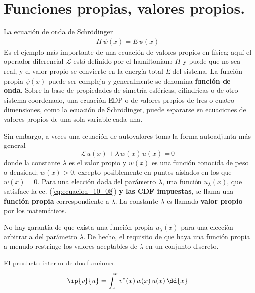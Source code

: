 \section{Funciones propias, valores propios.}
La ecuación de onda de Schrödinger
\begin{align*}
H \, \psi (x) = E \, \psi (x)
\end{align*}
Es el ejemplo más importante de una ecuación de valores propios en física; aquí el operador diferencial $\mathcal{L}$ está definido por el hamiltoniano $H$ y puede que no sea real, y el valor propio se convierte en la energía total $E$ del sistema. La función propia $\psi (x)$ puede ser compleja y generalmente se denomina \textbf{función de onda}. Sobre la base de propiedades de simetría esféricas, cilíndricas o de otro sistema coordenado, una ecuación EDP o de valores propios de tres o cuatro dimensiones, como la ecuación de Schrödinger, puede separarse en ecuaciones de valores propios de una sola variable cada una.
\par
Sin embargo, a veces una ecuación de autovalores toma la forma autoadjunta más general
\begin{equation}
\mathcal{L} \, u(x) + \lambda \, w(x) \, u(x) = 0
\label{eq:ecuacion_10_08}
\end{equation}
donde la constante $\lambda$ es el valor propio y $w(x)$ es una función conocida de peso o densidad; $w(x) > 0$, excepto posiblemente en puntos aislados en los que $w(x) = 0$. Para una elección dada del parámetro $\lambda$, una función $u_{\lambda}(x)$, que satisface la ec. (\ref{eq:ecuacion_10_08}) \textbf{y las CDF impuestas}, se llama una \textbf{función propia} correspondiente a $\lambda$. La constante $\lambda$ es llamada \textbf{valor propio} por los matemáticos.
\par
No hay garantía de que exista una función propia $u_{\lambda} (x)$ para una elección arbitraria del parámetro $\lambda$. De hecho, el requisito de que haya una función propia a menudo restringe los valores aceptables de $\lambda$ en un conjunto discreto. 
\par
El producto interno de dos funciones
\begin{align*}
\ip{v}{u} = \int_{a}^{b} v^{*}(x) \, w(x) \, u(x) \, \dd{x}
\end{align*}
